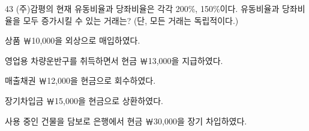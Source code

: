 \begin{question}{43}
(주)감평의 현재 유동비율과 당좌비율은 각각 200\%, 150\%이다. 유동비율과 당좌비율을 모두 증가시킬 수 있는 거래는? (단, 모든 거래는 독립적이다.)
\begin{choices}
  \item 상품 ￦10,000을 외상으로 매입하였다.
  \item 영업용 차량운반구를 취득하면서 현금 ￦13,000을 지급하였다.
  \item 매출채권 ￦12,000을 현금으로 회수하였다.
  \item 장기차입금 ￦15,000을 현금으로 상환하였다.
  \item 사용 중인 건물을 담보로 은행에서 현금 ￦30,000을 장기 차입하였다.
\end{choices}
\end{question}
